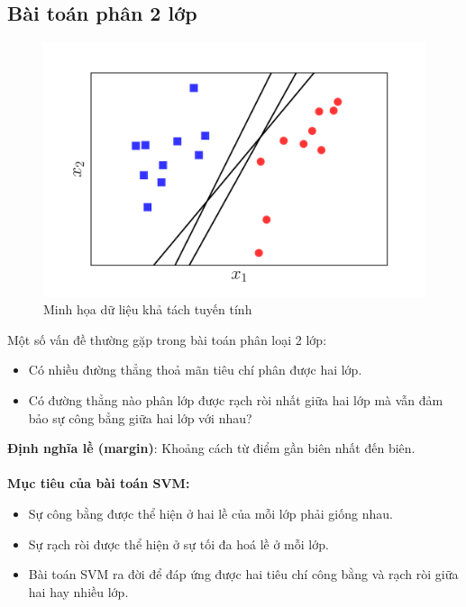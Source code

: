 \documentclass[a4paper, 12pt, oneside]{report}
\begin{document}
\subsection{Bài toán phân 2 lớp} 
\begin{center}
    \begin{figure}[H]
    \begin{center}
     \includegraphics[scale=0.08]{svm1.png}
    \end{center}
    \caption{Minh họa dữ liệu khả tách tuyến tính}
    \label{refhinh1}
    \end{figure}
\end{center} 
Một số vấn đề thường gặp trong bài toán phân loại 2 lớp: 
\begin{itemize}
    \item Có nhiều đường thẳng thoả mãn tiêu chí phân được hai lớp.
    \item Có đường thẳng nào phân lớp được rạch ròi nhất giữa hai lớp mà vẫn đảm bảo sự công bẳng giữa hai lớp với nhau?
\end{itemize}
\textbf{Định nghĩa lề (margin)}: Khoảng cách từ điểm gần biên nhất đến biên.\\ \\
\textbf{Mục tiêu của bài toán SVM: }
\begin{itemize}
\item Sự công bằng được thể hiện ở hai lề của mỗi lớp phải giống nhau. \\ 
\item Sự rạch ròi được thể hiện ở sự tối đa hoá lề ở mỗi lớp. \\
\item Bài toán SVM ra đời để đáp ứng được hai tiêu chí công bằng và rạch ròi giữa  hai hay nhiều lớp.
\end{itemize}
\end{document}
